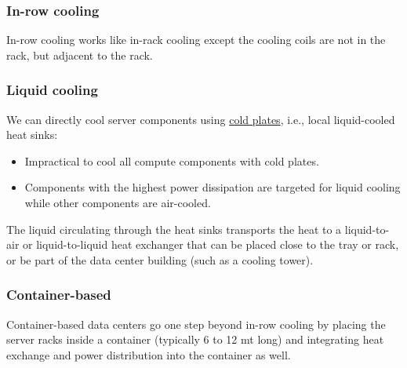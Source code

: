 \documentclass[10pt, oneside]{article}
\begin{document}
\subsubsection{In-row cooling}
In-row cooling works like in-rack cooling except the cooling coils are not in the rack, but adjacent to the rack.
\subsubsection{Liquid cooling}
We can directly cool server components using \underline{cold plates}, i.e., local liquid-cooled heat sinks:
\begin{itemize}
    \item Impractical to cool all compute components with cold plates.
    \item Components with the highest power dissipation are targeted
    for liquid cooling while other components are air-cooled.
\end{itemize}
The liquid circulating through the heat sinks transports the heat to a liquid-to-air or liquid-to-liquid heat exchanger that can be placed close to the tray or rack, or be part of the data center building (such as a cooling tower).
\subsubsection*{Container-based}
Container-based data centers go one step beyond in-row cooling by placing the server racks inside a container (typically 6 to 12 mt long) and integrating heat exchange and power distribution into the container as well.
\end{document}
